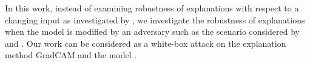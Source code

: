 \documentclass{article}
\begin{document}
In this work, instead of examining robustness of explanations with respect to a changing input as investigated by \citet{fragile}, we investigate the robustness of explanations when the model is modified by an adversary such as the scenario considered by \citet{trojan} and \citet{cleanse}. Our work can be considered as a white-box attack on the explanation method GradCAM and the model \citep{Papernot2016TowardsLearning}.


\begin{figure}[htb]
\centering

\end{figure}
\end{document}
